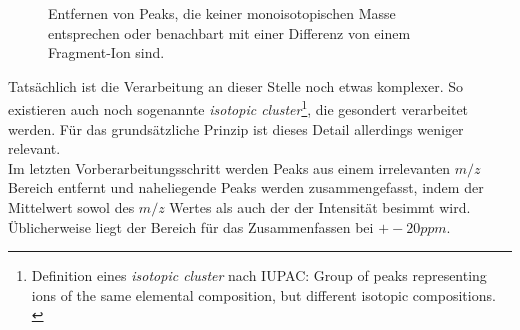 \documentclass[a4paper, 12pt]{article}
\newcommand{\gerquot}[1]{\glqq#1\grqq}
\newcommand{\tikzScale}{1.0}
\newcommand{\massCharge}{$ m/z $ }
\begin{document}
\begin{figure}[H]
\begin{minipage}[t]{.45\linewidth}
      \end{minipage}
      \caption{Entfernen von Peaks, die keiner monoisotopischen Masse entsprechen oder benachbart mit einer Differenz von einem Fragment-Ion sind.}
\end{figure}

Tatsächlich ist die Verarbeitung an dieser Stelle noch etwas komplexer. So existieren auch noch sogenannte \emph{isotopic cluster}\footnote{Definition eines \emph{isotopic cluster} nach IUPAC: \gerquot{Group of peaks representing ions of the same elemental composition, but different isotopic compositions.} \cite[1556]{IUPACDefinitions}}, die gesondert verarbeitet werden. Für das grundsätzliche Prinzip ist dieses Detail allerdings weniger relevant.\\

Im letzten Vorberarbeitungsschritt werden Peaks aus einem irrelevanten \massCharge Bereich entfernt und naheliegende Peaks werden zusammengefasst, indem der Mittelwert sowol des \massCharge Wertes als auch der der Intensität besimmt wird. Üblicherweise liegt der Bereich für das Zusammenfassen bei $ +- 20 ppm $.
\end{document}
